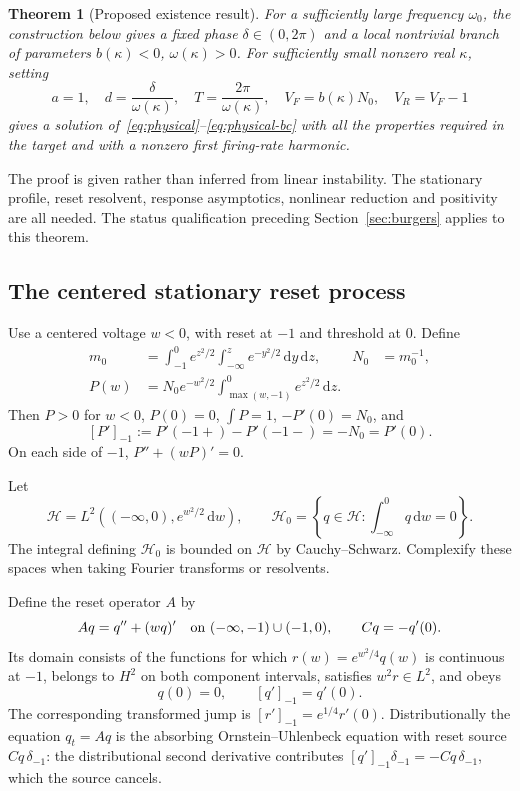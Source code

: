 \documentclass[11pt,a4paper]{article}
\numberwithin{equation}{section}
\newtheorem{theorem}{Theorem}[section]
\theoremstyle{remark}\newtheorem{remark}[theorem]{Remark}
\newcommand{\HH}{\mathcal H}\newcommand{\DD}{\mathcal D}
\newcommand{\dd}{\,\mathrm d}
\begin{document}
\begin{theorem}[Proposed existence result]\label{thm:nnlif}
For a sufficiently large frequency $\omega_0$, the construction below gives a fixed phase $\delta\in(0,2\pi)$ and a local nontrivial branch of parameters $b(\kappa)<0$, $\omega(\kappa)>0$. For sufficiently small nonzero real $\kappa$, setting
\[
 a=1,\quad d=\frac{\delta}{\omega(\kappa)},\quad
 T=\frac{2\pi}{\omega(\kappa)},\quad
 V_F=b(\kappa)N_0,\quad V_R=V_F-1
\]
gives a solution of~\eqref{eq:physical}--\eqref{eq:physical-bc} with all the properties required in the target and with a nonzero first firing-rate harmonic.
\end{theorem}

The proof is given rather than inferred from linear instability. The stationary profile, reset resolvent, response asymptotics, nonlinear reduction and positivity are all needed. The status qualification preceding Section~\ref{sec:burgers} applies to this theorem.

\subsection{The centered stationary reset process}
Use a centered voltage $w<0$, with reset at $-1$ and threshold at $0$. Define
\begin{align}
 m_0&=\int_{-1}^0 e^{z^2/2}\int_{-\infty}^{z}e^{-y^2/2}\dd y\dd z,
 &N_0&=m_0^{-1},\label{eq:N0}\\
 P(w)&=N_0e^{-w^2/2}\int_{\max(w,-1)}^0e^{z^2/2}\dd z.
 \label{eq:steadyP}
\end{align}
Then $P>0$ for $w<0$, $P(0)=0$, $\int P=1$, $-P'(0)=N_0$, and
\[
 [P']_{-1}:=P'(-1+)-P'(-1-)=-N_0=P'(0).
\]
On each side of $-1$, $P''+(wP)'=0$.

Let
\[
 \HH=L^2(( -\infty,0),e^{w^2/2}\dd w),\qquad
 \HH_0=\left\{q\in\HH:\int_{-\infty}^0q\dd w=0\right\}.
\]
The integral defining $\HH_0$ is bounded on $\HH$ by Cauchy--Schwarz. Complexify these spaces when taking Fourier transforms or resolvents.

Define the reset operator $A$ by
\begin{equation}\label{eq:Adef}
 Aq=q''+(wq)' \quad\hbox{on }(-\infty,-1)\cup(-1,0),
 \qquad Cq=-q'(0).
\end{equation}
Its domain consists of the functions for which $r(w)=e^{w^2/4}q(w)$ is continuous at $-1$, belongs to $H^2$ on both component intervals, satisfies $w^2r\in L^2$, and obeys
\begin{equation}\label{eq:Adomain}
 q(0)=0,\qquad [q']_{-1}=q'(0).
\end{equation}
The corresponding transformed jump is $[r']_{-1}=e^{1/4}r'(0)$. Distributionally the equation $q_t=Aq$ is the absorbing Ornstein--Uhlenbeck equation with reset source $Cq\,\delta_{-1}$: the distributional second derivative contributes $[q']_{-1}\delta_{-1}=-Cq\,\delta_{-1}$, which the source cancels.
\end{document}
